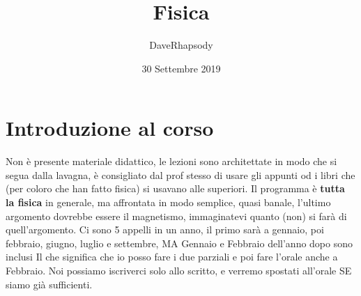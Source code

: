 \documentclass[12pt, a4paper, openany, twoside]{book}
\begin{document}
\pagestyle{plain}
\author{DaveRhapsody}
\title{Fisica}
\date{30 Settembre 2019}
\maketitle
\tableofcontents
\chapter{Introduzione al corso}
Non è presente materiale didattico, le lezioni sono architettate in modo che
si segua dalla lavagna, è consigliato dal prof stesso di usare gli appunti od i
libri che (per coloro che han fatto fisica) si usavano alle superiori.
\newline \newline
Il programma è \textbf{tutta la fisica} in generale, ma affrontata in modo 
semplice, quasi banale, l'ultimo argomento dovrebbe essere il magnetismo, 
immaginatevi
quanto (non) si farà di quell'argomento. Ci sono 5 appelli in un anno, il primo
sarà a gennaio, poi febbraio, giugno, luglio e settembre, MA Gennaio e 
Febbraio dell'anno dopo sono inclusi
\newline \newline
Il che significa che io posso fare i due parziali e poi fare l'orale anche a
Febbraio. Noi possiamo iscriverci solo allo scritto, e verremo spostati 
all'orale SE siamo già sufficienti. 
\end{document}
